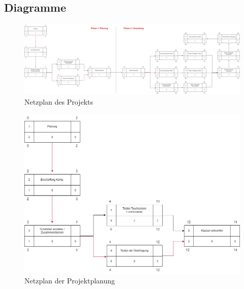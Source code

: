 \documentclass[a4paper, 11pt]{scrartcl}
\begin{document}
\begin{small}
\subsection{Diagramme}\label{ch:diags}
\begin{figure}[H]
    \begin{center}
        \includegraphics[scale=0.21]{Bilder/Netzplan.png}
        \caption{Netzplan des Projekts}\label{diag:netzplan}
    \end{center}
\end{figure}

\begin{figure}[H]
    \begin{center}
        \includegraphics[scale=0.4]{Bilder/netzplan_planung.png}
        \caption{Netzplan der Projektplanung}\label{diag:netzplan_planung}
    \end{center}
\end{figure}


\end{small}
\end{document}
